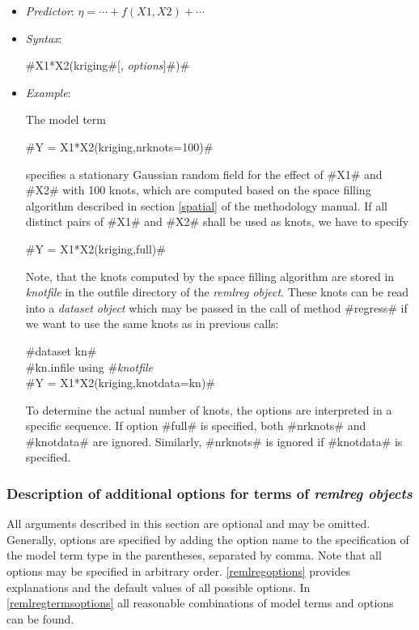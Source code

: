 \begin{itemize}
\item[] {\em Predictor}: $\eta= \cdots + f(X1,X2) + \cdots$
\item[] {\em Syntax}:

#X1*X2(kriging#[, {\em options}]#)# \item[] {\em Example}:

The model term

#Y = X1*X2(kriging,nrknots=100)#

specifies a stationary Gaussian random field for the effect of #X1#
and #X2# with 100 knots, which are computed based on the space
filling algorithm described in section \ref*{spatial} of the
methodology manual. If all distinct pairs of #X1# and #X2# shall be
used as knots, we have to specify

#Y = X1*X2(kriging,full)#

Note, that the knots computed by the space filling algorithm are
stored in {\it knotfile} in the outfile directory of the {\em
remlreg object}. These knots can be read into a {\em dataset object}
which may be passed in the call of method #regress# if we want to
use the same knots as in previous calls:

 #dataset kn#\\
 #kn.infile using #{\em knotfile}\\
 #Y = X1*X2(kriging,knotdata=kn)#

To determine the actual number of knots, the options are
interpreted in a specific sequence. If option #full# is specified,
both #nrknots# and #knotdata# are ignored. Similarly, #nrknots# is
ignored if #knotdata# is specified.

\end{itemize}

\subsubsection{Description of additional options for terms of {\em remlreg objects}}
\label{remlreglocaloptions}

All arguments described in this section are optional and may be
omitted. Generally, options are specified by adding the option
name to the specification of the model term type in the
parentheses, separated by comma. Note that all options may be
specified in arbitrary order. \autoref{remlregoptions} provides
explanations and the default values of all possible options. In
\autoref{remlregtermsoptions} all reasonable combinations of model
terms and options can be found.

